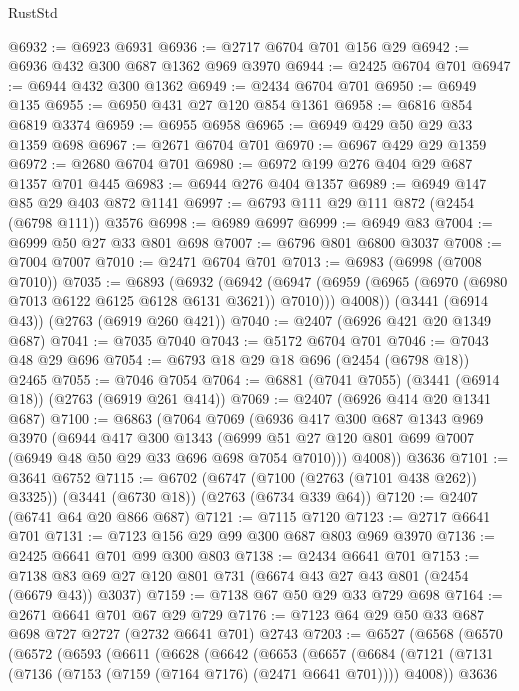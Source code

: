 \begin{lexlean}{RustStd}
\begin{coremodule}
@6932 := @6923 @6931
@6936 := @2717 @6704 @701 @156 @29
@6942 := @6936 @432 @300 @687 @1362 @969 @3970
@6944 := @2425 @6704 @701
@6947 := @6944 @432 @300 @1362
@6949 := @2434 @6704 @701
@6950 := @6949 @135
@6955 := @6950 @431 @27 @120 @854 @1361
@6958 := @6816 @854 @6819 @3374
@6959 := @6955 @6958
@6965 := @6949 @429 @50 @29 @33 @1359 @698
@6967 := @2671 @6704 @701
@6970 := @6967 @429 @29 @1359
@6972 := @2680 @6704 @701
@6980 := @6972 @199 @276 @404 @29 @687 @1357 @701 @445
@6983 := @6944 @276 @404 @1357
@6989 := @6949 @147 @85 @29 @403 @872 @1141
@6997 := @6793 @111 @29 @111 @872 (@2454 (@6798 @111)) @3576
@6998 := @6989 @6997
@6999 := @6949 @83
@7004 := @6999 @50 @27 @33 @801 @698
@7007 := @6796 @801 @6800 @3037
@7008 := @7004 @7007
@7010 := @2471 @6704 @701
@7013 := @6983 (@6998 (@7008 @7010))
@7035 := @6893
    (@6932
      (@6942
        (@6947 (@6959 (@6965 (@6970 (@6980 @7013 @6122 @6125 @6128 @6131 @3621)) @7010)))
        @4008))
    (@3441 (@6914 @43))
    (@2763 (@6919 @260 @421))
@7040 := @2407 (@6926 @421 @20 @1349 @687)
@7041 := @7035 @7040
@7043 := @5172 @6704 @701
@7046 := @7043 @48 @29 @696
@7054 := @6793 @18 @29 @18 @696 (@2454 (@6798 @18)) @2465
@7055 := @7046 @7054
@7064 := @6881 (@7041 @7055) (@3441 (@6914 @18)) (@2763 (@6919 @261 @414))
@7069 := @2407 (@6926 @414 @20 @1341 @687)
@7100 := @6863
    (@7064
      @7069
      (@6936
        @417
        @300
        @687
        @1343
        @969
        @3970
        (@6944
          @417
          @300
          @1343
          (@6999 @51 @27 @120 @801 @699 @7007 (@6949 @48 @50 @29 @33 @696 @698 @7054 @7010)))
        @4008))
    @3636
@7101 := @3641 @6752
@7115 := @6702
    (@6747 (@7100 (@2763 (@7101 @438 @262)) @3325))
    (@3441 (@6730 @18))
    (@2763 (@6734 @339 @64))
@7120 := @2407 (@6741 @64 @20 @866 @687)
@7121 := @7115 @7120
@7123 := @2717 @6641 @701
@7131 := @7123 @156 @29 @99 @300 @687 @803 @969 @3970
@7136 := @2425 @6641 @701 @99 @300 @803
@7138 := @2434 @6641 @701
@7153 := @7138 @83 @69 @27 @120 @801 @731 (@6674 @43 @27 @43 @801 (@2454 (@6679 @43)) @3037)
@7159 := @7138 @67 @50 @29 @33 @729 @698
@7164 := @2671 @6641 @701 @67 @29 @729
@7176 := @7123 @64 @29 @50 @33 @687 @698 @727 @2727 (@2732 @6641 @701) @2743
@7203 := @6527
    (@6568
      (@6570
        (@6572
          (@6593
            (@6611
              (@6628
                (@6642
                  (@6653
                    (@6657
                      (@6684
                        (@7121
                          (@7131 (@7136 (@7153 (@7159 (@7164 @7176) (@2471 @6641 @701)))) @4008))
                        @3636

\end{coremodule}
\end{lexlean}
